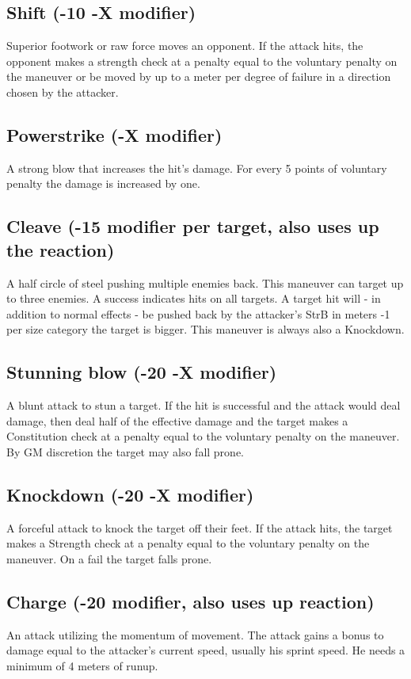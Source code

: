 \documentclass[12pt,a4paper,openany]{book}
\begin{document}
	\subsection*{Shift (-10 -X modifier)}
	Superior footwork or raw force moves an opponent. If the attack hits, the opponent makes a strength check at a penalty equal to the voluntary penalty on the maneuver or be moved by up to a meter per degree of failure in a direction chosen by the attacker.
	\subsection*{Powerstrike (-X modifier)}
	A strong blow that increases the hit’s damage. For every 5 points of voluntary penalty the damage is increased by one.
	\subsection*{Cleave (-15 modifier per target, also uses up the reaction)}
	A half circle of steel pushing multiple enemies back. This maneuver can target up to three enemies. A success indicates hits on all targets. A target hit will - in addition to normal effects - be pushed back by the attacker’s StrB in meters -1 per size category the target is bigger. This maneuver is always also a Knockdown.
	\subsection*{Stunning blow (-20 -X modifier)}
	A blunt attack to stun a target. If the hit is successful and the attack would deal damage, then deal half of the effective damage and the target makes a Constitution check at a penalty equal to the voluntary penalty on the maneuver. By GM discretion the target may also fall prone.
	\subsection*{Knockdown (-20 -X modifier)}
	A forceful attack to knock the target off their feet. If the attack hits, the target makes a Strength check at a penalty equal to the voluntary penalty on the maneuver. On a fail the target falls prone.
	\subsection*{Charge (-20 modifier, also uses up reaction)}
	An attack utilizing the momentum of movement. The attack gains a bonus to damage equal to the attacker’s current speed, usually his sprint speed. He needs a minimum of 4 meters of runup.
\end{document}
